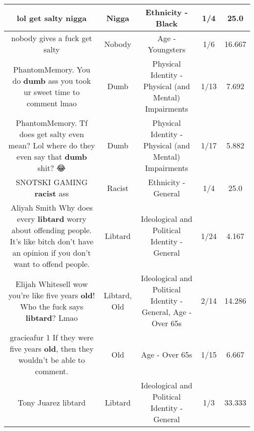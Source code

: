 \documentclass[11pt]{article}
\newlength\mylength
\begin{document}
\begin{center}
\begin{longtable}{|C{.65\mylength}|C{.30\mylength}|C{.12\mylength}|C{.12\mylength}|C{.12\mylength}|}
  \small lol get salty nigga\normalsize   & Nigga & Ethnicity - Black & 1/4 & 25.0 \\  \hline
  \small nobody gives a fuck get salty\normalsize   & Nobody & Age - Youngsters & 1/6 & 16.667 \\  \hline
  \small PhantomMemory. You do \textbf{dumb} ass you took ur sweet time to comment lmao\normalsize   & Dumb & Physical Identity - Physical (and Mental) Impairments & 1/13 & 7.692 \\  \hline
  \small PhantomMemory. Tf does get salty even mean? Lol where do they even say that \textbf{dumb} shit? 😂\normalsize   & Dumb & Physical Identity - Physical (and Mental) Impairments & 1/17 & 5.882 \\  \hline
  \small SNOTSKI GAMING \textbf{racist} ass\normalsize   & Racist & Ethnicity - General & 1/4 & 25.0 \\  \hline
  \small Aliyah Smith Why does every \textbf{libtard} worry about offending people. It's like bitch don't have an opinion if you don't want to offend people.\normalsize   & Libtard &  Ideological and Political Identity - General & 1/24 & 4.167 \\  \hline
  \small Elijah Whitesell wow you're like five years \textbf{old}! Who the fuck says \textbf{libtard}? Lmao\normalsize   & Libtard, Old &  Ideological and Political Identity - General, Age - Over 65s & 2/14 & 14.286 \\  \hline
  \small gracieafur 1 If they were five years \textbf{old}, then they wouldn't be able to comment.\normalsize   & Old & Age - Over 65s & 1/15 & 6.667 \\  \hline
  \small Tony Juarez libtard\normalsize   & Libtard &  Ideological and Political Identity - General & 1/3 & 33.333 \\  \hline

\end{longtable}
\end{center}
\end{document}
